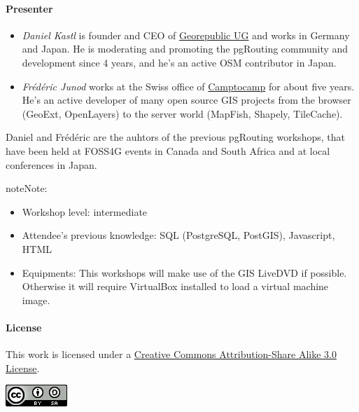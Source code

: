 \documentclass[a4paper,10pt,english]{manual}
\begin{document}
\paragraph{Presenter}
\begin{itemize}
\item {} 
\emph{Daniel Kastl} is founder and CEO of \href{http://georepublic.de}{Georepublic UG} and works in Germany and Japan. He is moderating and promoting the pgRouting community and development since 4 years, and he's an active OSM contributor in Japan.

\item {} 
\emph{Frédéric Junod} works at the Swiss office of \href{http://www.camptocamp.com}{Camptocamp} for about five years. He's an active developer of many open source GIS projects from the browser (GeoExt, OpenLayers) to the server world (MapFish, Shapely, TileCache).

\end{itemize}

Daniel and Frédéric are the auhtors of the previous pgRouting workshops, that have been held at FOSS4G events in Canada and South Africa and at local conferences in Japan.

\begin{notice}{note}{Note:}\begin{itemize}
\item {} 
Workshop level: intermediate

\item {} 
Attendee's previous knowledge: SQL (PostgreSQL, PostGIS), Javascript, HTML

\item {} 
Equipments: This workshops will make use of the GIS LiveDVD if possible. Otherwise it will require VirtualBox installed to load a virtual machine image.

\end{itemize}
\end{notice}
\paragraph{License}

This work is licensed under a \href{http://creativecommons.org/licenses/by-sa/3.0/}{Creative Commons Attribution-Share Alike 3.0 License}.

\includegraphics{license.png}
\end{document}

